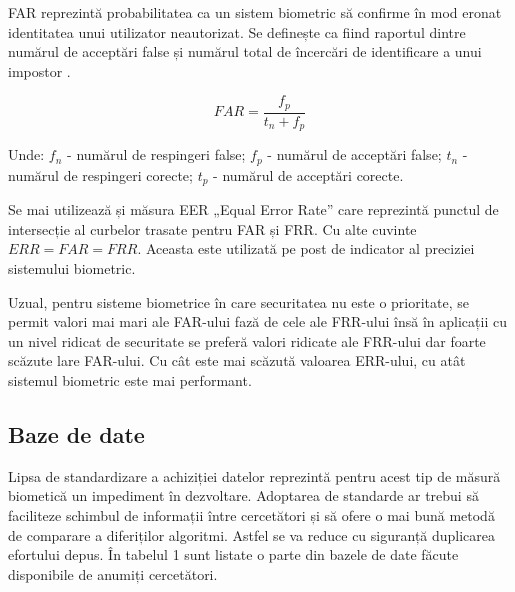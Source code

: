 \documentclass[9pt,shortpaper,twoside,web]{ieeecolor}
\begin{document}
FAR reprezintă probabilitatea ca un sistem biometric să confirme în mod eronat identitatea unui utilizator neautorizat. Se definește ca fiind raportul dintre numărul de acceptări false și numărul total de încercări de identificare a unui impostor \cite{b7}.

\begin{equation} \label{eq1}
FAR = \frac{f_p}{t_n + f_p}
\end{equation}

Unde: $f_n$ - numărul de respingeri false; $f_p$ - numărul de acceptări false; $t_n$ - numărul de respingeri corecte; $t_p$ - numărul de acceptări corecte.

	Se mai utilizează și măsura EER „Equal Error Rate” care reprezintă punctul de intersecție al curbelor trasate pentru FAR și FRR. Cu alte cuvinte $ERR = FAR = FRR$. Aceasta este utilizată pe post de indicator al preciziei sistemului biometric.
	
	Uzual, pentru sisteme biometrice în care securitatea nu este o prioritate, se permit valori mai mari ale FAR-ului fază de cele ale FRR-ului însă în aplicații cu un nivel ridicat de securitate se preferă valori ridicate ale FRR-ului dar foarte scăzute lare FAR-ului. Cu cât este mai scăzută valoarea ERR-ului, cu atât sistemul biometric este mai performant.

\subsection{Baze de date}
	Lipsa de standardizare a achiziției datelor reprezintă pentru acest tip de măsură biometică un impediment în dezvoltare. Adoptarea de standarde ar trebui să faciliteze schimbul de informații între cercetători  și să ofere o mai bună metodă de comparare a diferiților algoritmi. Astfel se va reduce cu siguranță duplicarea efortului depus.
	În tabelul 1 sunt listate o parte din bazele de date făcute disponibile de anumiți cercetători. 
\\
\end{document}
